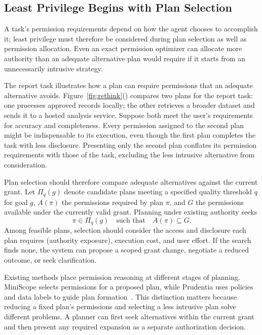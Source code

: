 \subsection{Least Privilege Begins with Plan Selection}\label{sec:rethink-plans}
A task's permission requirements depend on how the agent chooses to accomplish it; least privilege must therefore be considered during plan selection as well as permission allocation. Even an exact permission optimizer can allocate more authority than an adequate alternative plan would require if it starts from an unnecessarily intrusive strategy.

The report task illustrates how a plan can require permissions that an adequate alternative avoids. Figure~\ref{fig:rethink}() compares two plans for the report task: one processes approved records locally; the other retrieves a broader dataset and sends it to a hosted analysis service. Suppose both meet the user's requirements for accuracy and completeness. Every permission assigned to the second plan might be indispensable to its execution, even though the first plan completes the task with less disclosure. Presenting only the second plan conflates its permission requirements with those of the task, excluding the less intrusive alternative from consideration.

Plan selection should therefore compare adequate alternatives against the current grant. Let $\Pi_q(g)$ denote candidate plans meeting a specified quality threshold $q$ for goal $g$, $A(\pi)$ the permissions required by plan $\pi$, and $G$ the permissions available under the currently valid grant. Planning under existing authority seeks
\begin{equation}
\pi \in \Pi_q(g) \quad\text{such that}\quad A(\pi)\subseteq G.
\label{eq:planning}
\end{equation}
Among feasible plans, selection should consider the access and disclosure each plan requires (authority exposure), execution cost, and user effort. If the search finds none, the system can propose a scoped grant change, negotiate a reduced outcome, or seek clarification.

Existing methods place permission reasoning at different stages of planning. MiniScope selects permissions for a proposed plan, while Prudentia uses policies and data labels to guide plan formation~\cite{miniscope,prudentia}. This distinction matters because reducing a fixed plan's permissions and selecting a less intrusive plan solve different problems. A planner can first seek alternatives within the current grant and then present any required expansion as a separate authorization decision.

